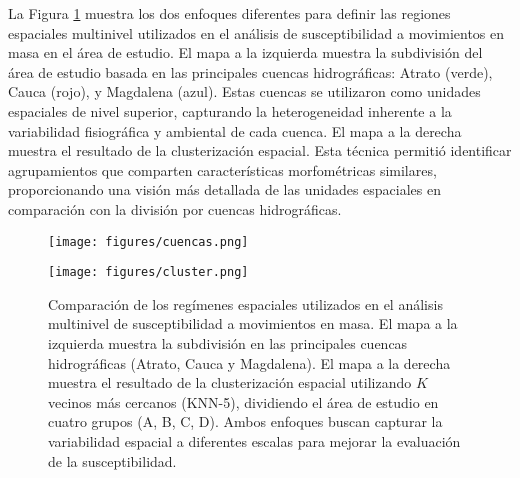 \documentclass[
  manuscript=article,  
  layout=preprint,  
]{format}
\begin{document}
La Figura \ref{fig:niveles} muestra los dos enfoques diferentes para definir las regiones espaciales multinivel utilizados en el análisis de susceptibilidad a movimientos en masa en el área de estudio. El mapa a la izquierda muestra la subdivisión del área de estudio basada en las principales cuencas hidrográficas: Atrato (verde), Cauca (rojo), y Magdalena (azul). Estas cuencas se utilizaron como unidades espaciales de nivel superior, capturando la heterogeneidad inherente a la variabilidad fisiográfica y ambiental de cada cuenca. El mapa a la derecha muestra el resultado de la clusterización espacial. Esta técnica permitió identificar agrupamientos que comparten características morfométricas similares, proporcionando una visión más detallada de las unidades espaciales en comparación con la división por cuencas hidrográficas.

\begin{figure}[ht!]
  \begin{minipage}{.48\linewidth}
    \centering
      {\texttt{[image: figures/cuencas.png]}}
  \end{minipage}\quad
  \begin{minipage}{.48\linewidth}
    \centering
      {\texttt{[image: figures/cluster.png]}}
  \end{minipage}
\caption{Comparación de los regímenes espaciales utilizados en el análisis multinivel de susceptibilidad a movimientos en masa. El mapa a la izquierda muestra la subdivisión en las principales cuencas hidrográficas (Atrato, Cauca y Magdalena). El mapa a la derecha muestra el resultado de la clusterización espacial utilizando $K$ vecinos más cercanos (KNN-5), dividiendo el área de estudio en cuatro grupos (A, B, C, D). Ambos enfoques buscan capturar la variabilidad espacial a diferentes escalas para mejorar la evaluación de la susceptibilidad.}
    \label{fig:niveles}
\end{figure}
\end{document}
